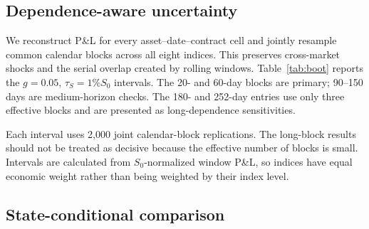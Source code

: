 ﻿\documentclass[12pt,letterpaper]{article}
\newcommand{\tabnote}[1]{\begin{minipage}{\linewidth}\vspace{4pt}\footnotesize\singlespacing #1\end{minipage}}
\begin{document}
\subsection{Dependence-aware uncertainty}

We reconstruct P\&L for every asset--date--contract cell and jointly resample
common calendar blocks across all eight indices. This preserves cross-market
shocks and the serial overlap created by rolling windows. Table~\ref{tab:boot}
reports the $g=0.05$, $\tau_S=1\%S_0$ intervals. The 20- and 60-day blocks are primary;
90--150 days are medium-horizon checks. The 180- and 252-day entries use only
three effective blocks and are presented as long-dependence sensitivities.

\begin{table}[ht]
\singlespacing
\centering
\caption{Joint calendar-block bootstrap, unconditional P\&L/$S_0$ at $g=0.05$ and $\tau_S=1\%S_0$}
\label{tab:boot}
\tabnote{Each interval uses 2{,}000 joint calendar-block replications. The
long-block results should not be treated as decisive because the effective
number of blocks is small. Intervals are calculated from $S_0$-normalized
window P\&L, so indices have equal economic weight rather than being weighted
by their index level.}
\end{table}

\subsection{State-conditional comparison}
\end{document}
